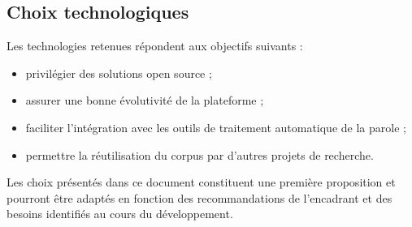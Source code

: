 
\subsection{Choix technologiques}

Les technologies retenues répondent aux objectifs suivants :

\begin{itemize}

\item privilégier des solutions open source ;

\item assurer une bonne évolutivité de la plateforme ;

\item faciliter l'intégration avec les outils de traitement automatique
de la parole ;

\item permettre la réutilisation du corpus par d'autres projets de
recherche.

\end{itemize}

Les choix présentés dans ce document constituent une première
proposition et pourront être adaptés en fonction des recommandations de
l'encadrant et des besoins identifiés au cours du développement.